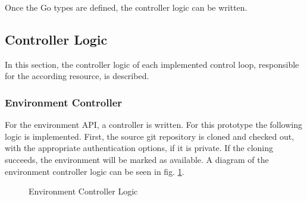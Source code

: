 
Once the Go types are defined,
the controller logic can be written.

\subsection{Controller Logic}

In this section,
the controller logic of each implemented control loop, responsible for the according resource,
is described.

\subsubsection*{Environment Controller}

For the environment API,
a controller is written.
For this prototype the following logic is implemented.
First, the source git repository is cloned and checked out,
with the appropriate authentication options, if it is private.
If the cloning succeeds, the environment will be marked as available.
A diagram of the environment controller logic can be seen in fig. \ref{tikz:environment-controller-logic}.

\begin{figure}[h]
\centering
{}
\caption{Environment Controller Logic} \label{tikz:environment-controller-logic}
\end{figure}

%	
%	
%	
%	
%	

